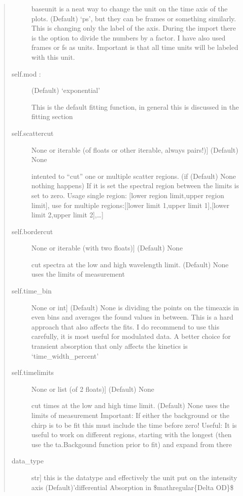 \documentclass[letterpaper,10pt,english]{sphinxmanual}
\begin{document}
\begin{fulllineitems}
\begin{fulllineitems}
\begin{quote}
\begin{description}
baseunit is a neat way to change the unit on the time axis of the plots. (Default) ‘ps’, but they
can be frames or something similarly. This is changing only the label of the axis.
During the import there is the option to divide the numbers by a factor.
I have also used frames or fs as units. Important is that all time units will be labeled with
this unit.

\item[{self.mod  :}] \leavevmode
(Default)  ‘exponential’

This is the default fitting function, in general this is discussed in the fitting section

\item[{self.scattercut}] \leavevmode{[}None or iterable (of floats or other iterable, always pairs!){]}
(Default)  None

intented to “cut” one or multiple scatter regions. (if (Default) None nothing
happens) If it is set the spectral region between the limits is set to zero.
Usage single region: {[}lower region limit,upper region limit{]},
use for multiple regions:{[}{[}lower limit 1,upper limit 1{]},{[}lower limit 2,upper limit 2{]},…{]}

\item[{self.bordercut}] \leavevmode{[}None or iterable (with two floats){]}
(Default)  None

cut spectra at the low and high wavelength limit. (Default) None
uses the limits of measurement

\item[{self.time\_bin}] \leavevmode{[}None or int{]}
(Default)  None
is dividing the points on the time\sphinxhyphen{}axis in even bins and averages the found values in between.
This is a hard approach that also affects the fits. I do recommend to use this carefully,
it is most useful for modulated data. A better choice for transient absorption that only
affects the kinetics is ‘time\_width\_percent’

\item[{self.timelimits}] \leavevmode{[}None or list (of 2 floats){]}
(Default)  None

cut times at the low and high time limit. (Default) None uses the limits of measurement
Important: If either the background or the chirp is to be fit this must include the
time before zero! Useful: It is useful to work on different regions, starting with
the longest (then use the ta.Backgound function prior to fit) and expand from there

\item[{data\_type}] \leavevmode{[}str{]}
this is the datatype and effectively the unit put on the intensity axis
(Default)’differential Absorption in \$mathregular\{Delta OD\}\$


\end{description}
\end{quote}
\end{fulllineitems}
\end{fulllineitems}
\end{document}
